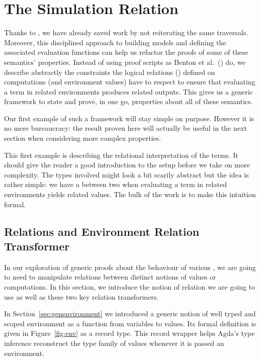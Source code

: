 \chapter{The Simulation Relation}
\label{sec:simulationrel}

Thanks to , we have already saved work by not reiterating the
same traversals. Moreover, this disciplined approach to building models and
defining the associated evaluation functions can help us refactor the proofs
of some of these semantics' properties.
%
Instead of using proof scripts as Benton et al.~(\citeyear{benton2012strongly})
do, we describe abstractly the constraints the logical relations
(\cite{reynolds1983types})
defined on computations (and environment values) have to respect to ensure
that evaluating a term in related environments
produces related outputs. This gives us a generic framework to
state and prove, in one go, properties about all of these semantics.

Our first example of such a framework will stay simple on purpose.
However it is no mere bureaucracy: the
result proven here will actually be useful in the next section
when considering more complex properties.

This first example is describing the relational interpretation of the terms.
It should give the reader a good introduction to the setup before we take on
more complexity. The types involved might look a bit scarily abstract but the
idea is rather simple: we have a  between two 
when evaluating a term in related environments yields related values. The bulk
of the work is to make this intuition formal.



\section{Relations and Environment Relation Transformer}
\label{sec:relation-transformers}

In our exploration of generic proofs about the behaviour of
various , we are going to need to manipulate
relations between distinct notions of values or computations.
In this section, we introduce the notion of relation we are going to
use as well as these two key relation transformers.

In Section~\ref{sec:genenvironment} we introduced a generic notion
of well typed and scoped environment as a function from variables
to values. Its formal definition is given in Figure~\ref{fig:env}
as a record type. This record wrapper helps Agda's type inference
reconstruct the type family of values whenever it is passed an
environment.

